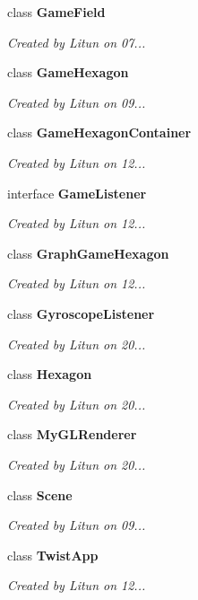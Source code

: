 \begin{DoxyCompactItemize}
class \textbf{ Game\+Field}
\begin{DoxyCompactList}\small\item\em Created by Litun on 07... \end{DoxyCompactList}\item 
class \textbf{ Game\+Hexagon}
\begin{DoxyCompactList}\small\item\em Created by Litun on 09... \end{DoxyCompactList}\item 
class \textbf{ Game\+Hexagon\+Container}
\begin{DoxyCompactList}\small\item\em Created by Litun on 12... \end{DoxyCompactList}\item 
interface \textbf{ Game\+Listener}
\begin{DoxyCompactList}\small\item\em Created by Litun on 12... \end{DoxyCompactList}\item 
class \textbf{ Graph\+Game\+Hexagon}
\begin{DoxyCompactList}\small\item\em Created by Litun on 12... \end{DoxyCompactList}\item 
class \textbf{ Gyroscope\+Listener}
\begin{DoxyCompactList}\small\item\em Created by Litun on 20... \end{DoxyCompactList}\item 
class \textbf{ Hexagon}
\begin{DoxyCompactList}\small\item\em Created by Litun on 20... \end{DoxyCompactList}\item 
class \textbf{ My\+G\+L\+Renderer}
\begin{DoxyCompactList}\small\item\em Created by Litun on 20... \end{DoxyCompactList}\item 
class \textbf{ Scene}
\begin{DoxyCompactList}\small\item\em Created by Litun on 09... \end{DoxyCompactList}\item 
class \textbf{ Twist\+App}
\begin{DoxyCompactList}\small\item\em Created by Litun on 12... \end{DoxyCompactList}\end{DoxyCompactItemize}
